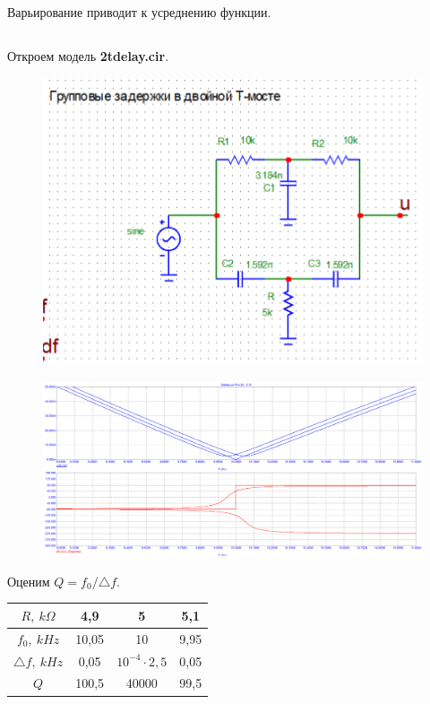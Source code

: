 \documentclass{article}
\begin{document}
Варьирование приводит к усреднению функции.

\subsection{}

Откроем модель \textbf{2tdelay.cir}. 

\begin{figure}[H]
\centering
\includegraphics[scale=0.4]{2tdelay_img.png}
\label{fig:Image1}
\end{figure}

\begin{figure}[H]
\centering
\includegraphics[scale=0.4]{2tdelay_AC1.png}
\label{fig:Image1}
\end{figure}

Оценим $Q = f_0/\triangle f$.

\begin{center}
\begin{tabular}{|c|c|c|c|}
\hline 
$R, \: k\Omega$ & 4,9 & 5 & 5,1 \\ 
\hline 
$f_0, \: kHz$ & 10,05 & 10 & 9,95 \\ 
\hline 
$\triangle f, \: kHz$ & 0,05 & $10^{-4}\cdot 2,5$ & 0,05 \\ 
\hline 
$Q$ & 100,5 & 40000 & 99,5 \\ 
\hline 
\end{tabular}
\end{center}
\end{document}
